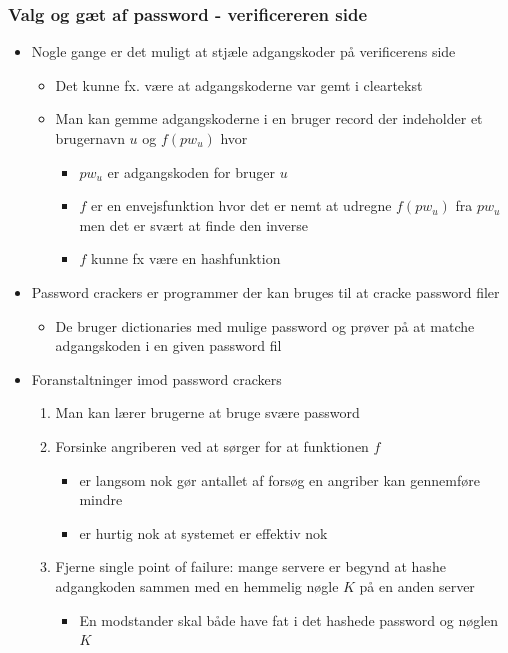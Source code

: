 \documentclass[a4, english]{article}
\begin{document}
\subsubsection{Valg og gæt af password - verificereren side}
\begin{itemize}
	\item Nogle gange er det muligt at stjæle adgangskoder på verificerens side 
  \begin{itemize}
  	\item Det kunne fx. være at adgangskoderne var gemt i cleartekst 
    \item Man kan gemme adgangskoderne i en bruger record der indeholder et brugernavn $u$ og $f(pw_u)$ hvor
    \begin{itemize}
    	\item $pw_u$ er adgangskoden for bruger $u$
      \item $f$ er en envejsfunktion hvor det er nemt at udregne $f(pw_u)$ fra $pw_u$ men det er svært at finde den inverse 
      \item $f$ kunne fx være en hashfunktion 
    \end{itemize} 
  \end{itemize}  
  \item Password crackers er programmer der kan bruges til at cracke password filer  
  \begin{itemize}
    \item De bruger dictionaries med mulige password og prøver på at matche adgangskoden i en given password fil
  \end{itemize}
  \item Foranstaltninger imod password crackers  
  \begin{enumerate}
  	\item Man kan lærer brugerne at bruge svære password  
    \item Forsinke angriberen ved at sørger for at funktionen $f$
    \begin{itemize}
    	\item er langsom nok gør antallet af forsøg en angriber kan gennemføre mindre  
      \item er hurtig nok at systemet er effektiv nok
    \end{itemize}
    \item Fjerne single point of failure: mange servere er begynd at hashe adgangkoden sammen med en hemmelig nøgle $K$ på en anden server    
    \begin{itemize}
    	\item En modstander skal både have fat i det hashede password og nøglen $K$

\end{itemize}
\end{enumerate}
\end{itemize}
\end{document}
